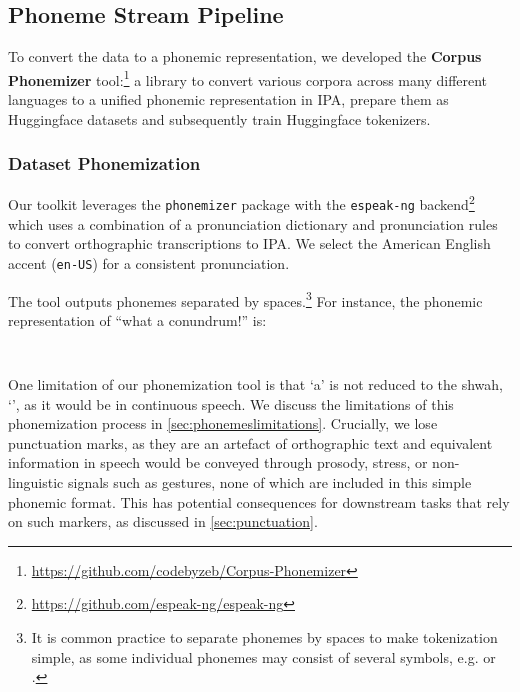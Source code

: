 \subsection{Phoneme Stream Pipeline}
\label{sec:pipeline}

To convert the data to a phonemic representation, we developed the \textbf{Corpus Phonemizer} tool:\footnote{\url{https://github.com/codebyzeb/Corpus-Phonemizer}} a library to convert various corpora across many different languages to a unified phonemic representation in IPA, prepare them as Huggingface datasets and subsequently train Huggingface tokenizers.

\subsubsection{Dataset Phonemization}

Our toolkit leverages the \texttt{phonemizer} package \citep{Bernard2021} with the \texttt{espeak-ng} backend\footnote{\url{https://github.com/espeak-ng/espeak-ng}} which uses a combination of a pronunciation dictionary and pronunciation rules to convert orthographic transcriptions to IPA. We select the American English accent (\texttt{en-US}) for a consistent pronunciation. 

The tool outputs phonemes separated by spaces.\footnote{It is common practice to separate phonemes by spaces to make tokenization simple, as some individual phonemes may consist of several symbols, e.g.  or .} For instance, the phonemic representation of ``what a conundrum!'' is:

\vspace{-2mm}
\begin{center}
\texttt{ \textvisiblespace~ \textvisiblespace~ \textvisiblespace~}
\end{center}
\vspace{-1mm}

\noindent
One limitation of our phonemization tool is that `a' is not reduced to the shwah, `', as it would be in continuous speech. We discuss the limitations of this phonemization process in \cref{sec:phonemeslimitations}. Crucially, we lose punctuation marks, as they are an artefact of orthographic text and equivalent information in speech would be conveyed through prosody, stress, or non-linguistic signals such as gestures, none of which are included in this simple phonemic format. This has potential consequences for downstream tasks that rely on such markers, as discussed in \cref{sec:punctuation}.

